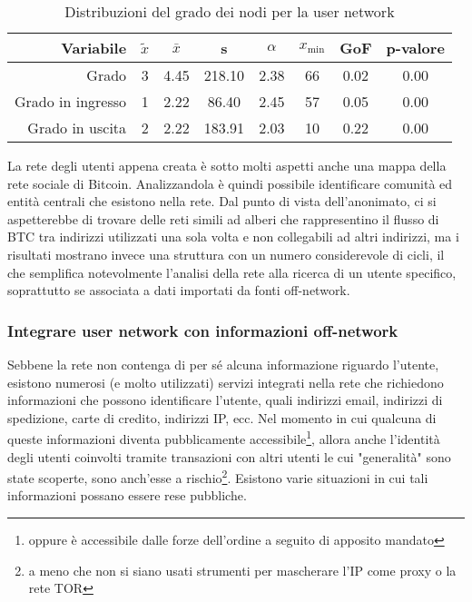 \begin{table}
\centering
\caption{Distribuzioni del grado dei nodi per la user network\label{table:gofuser}}
\begin{tabular}{r | c c c c c c c}
\textbf{Variabile} & \textbf{$\tilde{x}$} & \textbf{$\bar{x}$} & \textbf{s} & \textbf{$\alpha$} & \textbf{$x_\text{min}$} & \textbf{GoF} & \textbf{p-valore} \\
\hline
Grado & 3 & 4.45 & 218.10 & 2.38 & 66 & 0.02 & 0.00 \\
Grado in ingresso & 1 & 2.22 & 86.40 & 2.45 & 57 & 0.05 & 0.00 \\
Grado in uscita & 2 & 2.22 & 183.91 & 2.03 & 10 & 0.22 & 0.00 \\
\end{tabular}
\end{table}

La rete degli utenti appena creata è sotto molti aspetti anche una mappa della rete sociale di Bitcoin. Analizzandola è quindi possibile identificare comunità ed entità centrali che esistono nella rete.
Dal punto di vista dell'anonimato, ci si aspetterebbe di trovare delle reti simili ad alberi che rappresentino il flusso di BTC tra indirizzi utilizzati una sola volta e non collegabili ad altri indirizzi, ma i risultati mostrano invece una struttura con un numero considerevole di cicli, il che semplifica notevolmente l'analisi della rete alla ricerca di un utente specifico, soprattutto se associata a dati importati da fonti off-network.

\subsubsection{Integrare user network con informazioni off-network}

Sebbene la rete non contenga di per sé alcuna informazione riguardo l'utente, esistono numerosi (e molto utilizzati) servizi integrati nella rete che richiedono informazioni che possono identificare l'utente, quali indirizzi email, indirizzi di spedizione, carte di credito, indirizzi IP, ecc.
Nel momento in cui qualcuna di queste informazioni diventa pubblicamente accessibile\footnote{oppure è accessibile dalle forze dell'ordine a seguito di apposito mandato}, allora anche l'identità degli utenti coinvolti tramite transazioni con altri utenti le cui "generalità" sono state scoperte, sono anch'esse a rischio\footnote{a meno che non si siano usati strumenti per mascherare l'IP come proxy o la rete TOR}. Esistono varie situazioni in cui tali informazioni possano essere rese pubbliche.

